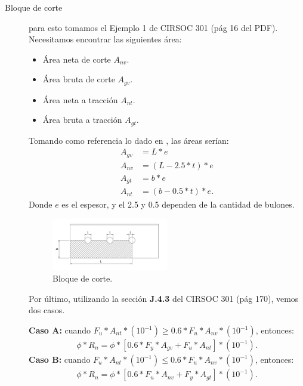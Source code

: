 \documentclass[../main.tex]{subfiles}
\begin{document}
\begin{description}
  \item[Bloque de corte] para esto tomamos el Ejemplo 1 de CIRSOC 301 (pág 16 del
    PDF). Necesitamos encontrar las siguientes área:
    \begin{itemize}
      \item Área neta de corte $A_{nv}$.
      \item Área bruta de corte $A_{gv}$.
      \item Área neta a tracción $A_{nt}$.
      \item Área bruta a tracción $A_{gt}$.
    \end{itemize}
    Tomando como referencia lo dado en , las áreas serían:
    \begin{align*}
      A_{gv} &= L*e \\
      A_{nv} &= (L-2.5*t)*e \\
      A_{gt} &= b * e \\
      A_{nt} &= (b - 0.5*t)*e
    .\end{align*}
    Donde $e$ es el espesor, y el 2.5 y 0.5 dependen de la cantidad de bulones. 
    \begin{figure}[ht]
      \centering
      \includegraphics[width=0.5\textwidth]{../images/resumen/bloque}
      \caption{Bloque de corte.}
      \label{fig:bloque}
    \end{figure}

    Por último, utilizando la sección \textbf{J.4.3} del CIRSOC 301 (pág 170), 
    vemos dos casos.

    \textbf{Caso A:} cuando
    $F_u * A_{nt} * (10^{-1}) \geq 0.6 * F_u * A_{nv} * (10^{-1})$, entonces:
    \begin{align*}
      \phi * R_n = \phi * [0.6 * F_y * A_{gv} + F_u * A_{nt}] * (10^{-1})
    .\end{align*}
    \textbf{Caso B:} cuando
    $F_u * A_{nt} * (10^{-1}) \leq 0.6 * F_u * A_{nv} * (10^{-1})$, entonces:
    \begin{align*}
      \phi * R_n = \phi * [0.6 * F_u * A_{nv} + F_y * A_{gt}] * (10^{-1})
    .\end{align*}
\end{description}
\end{document}

